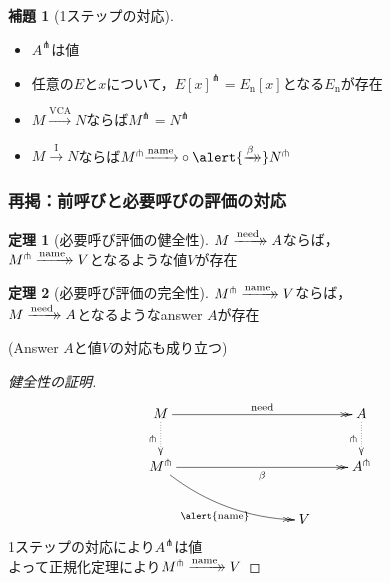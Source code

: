 \documentclass[dvipdfmx,cjk,xcolor=dvipsnames,envcountsect,notheorems,12pt]{beamer}
\theoremstyle{definition}
\newtheorem{theorem}{定理}
\newtheorem{lemma}{補題}
\newcommand{\xtwoheadrightarrow}[2][]{%
  \xrightarrow[#1]{#2}\mathrel{\mkern-14mu}\rightarrow
}
\newcommand{\EXPANDLET}[1]{#1^\pitchfork}
\newcommand{\CALLBYNEEDI}{\xrightarrow{\mathrm{I}}}
\newcommand{\CALLBYNEEDVCA}{\xrightarrow{\mathrm{VCA}}}
\newcommand{\CALLBYNAME}{\xrightarrow{\mathrm{name}}}
\newcommand{\RTCLOSFULLBETA}{\xtwoheadrightarrow{\beta}}
\newcommand{\RTCLOSCALLBYNEED}{\xtwoheadrightarrow{\mathrm{need}}}
\newcommand{\RTCLOSCALLBYNAME}{\xtwoheadrightarrow{\mathrm{name}}}
\begin{document}
\begin{frame}
	\begin{lemma}[1ステップの対応]
	\begin{itemize}
		\item $\EXPANDLET{A}$は値
		\item 任意の$E$と$x$について，$\EXPANDLET{E[x]} = E_\mathrm{n}[x]$となる$E_\mathrm{n}$が存在
		\item $M \CALLBYNEEDVCA N$ならば\alert{$\EXPANDLET{M} = \EXPANDLET{N}$}
		\item $M \CALLBYNEEDI N$ならば$\EXPANDLET{M}{\CALLBYNAME}\circ{\alert{\RTCLOSFULLBETA}} \EXPANDLET{N}$
	\end{itemize}
	\end{lemma}
\end{frame}

\begin{frame}
	\frametitle{再掲：前呼びと必要呼びの評価の対応}
	\Large
	\begin{theorem}[必要呼び評価の健全性]
		$M\RTCLOSCALLBYNEED A$ならば，\\
		$\EXPANDLET{M}\RTCLOSCALLBYNAME V$となるような値$V$が存在
	\end{theorem}
	\begin{theorem}[必要呼び評価の完全性]
		$\EXPANDLET{M}\RTCLOSCALLBYNAME V$ならば，\\
		$M\RTCLOSCALLBYNEED A$となるようなanswer $A$が存在
	\end{theorem}
	\begin{center}
		\Large (Answer $A$と値$V$の対応も成り立つ)
	\end{center}
\end{frame}

\begin{frame}
	\begin{proof}[健全性の証明]
		\Large
		\[\xymatrix{
			M \ar@{->>}[rrrr]^-{\mathrm{need}} \ar@{.>}[d]_-\pitchfork & & & & A \ar@{.>}[d]_-\pitchfork \\
			\EXPANDLET{M} \ar@{->>}[rrrr]_-{\beta} \ar@{->>}@/_10pt/@[red][rrrd]_-{\alert{\mathrm{name}}} & & & & \EXPANDLET{A} \\
			& & & V &
		} \]
		1ステップの対応により$\EXPANDLET{A}$は値\\
		よって正規化定理により$\EXPANDLET{M}\RTCLOSCALLBYNAME V$
	\end{proof}
\end{frame}
\end{document}
